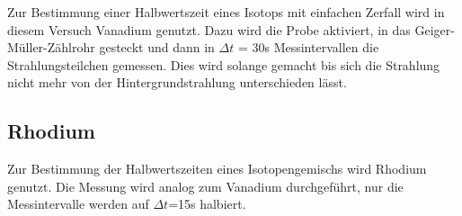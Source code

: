 \noindent Zur Bestimmung einer Halbwertszeit eines Isotops mit einfachen Zerfall wird in diesem Versuch Vanadium genutzt. Dazu wird die Probe aktiviert,
in das Geiger-Müller-Zählrohr gesteckt und dann in $\Delta t$ = 30s Messintervallen die Strahlungsteilchen gemessen. Dies wird solange gemacht 
bis sich die Strahlung nicht mehr von der Hintergrundstrahlung unterschieden lässt.

\subsection{Rhodium}

\noindent Zur Bestimmung der Halbwertszeiten eines Isotopengemischs wird Rhodium genutzt. Die Messung wird analog zum Vanadium durchgeführt, 
nur die Messintervalle werden auf $\Delta t$=15s halbiert.